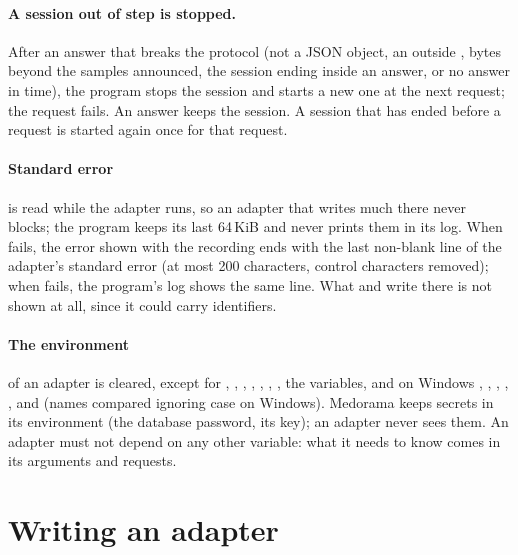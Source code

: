 \paragraph{A session out of step is stopped.} After an answer that breaks the protocol (not a
JSON object, an  outside , bytes beyond the samples announced, the
session ending inside an answer, or no answer in time), the program stops the session and starts
a new one at the next request; the request fails. An answer  keeps the
session. A session that has ended before a request is started again once for that request.

\paragraph{Standard error} is read while the adapter runs, so an adapter that writes much there
never blocks; the program keeps its last 64\,KiB and never prints them in its log. When
 fails, the error shown with the recording ends with the last non-blank line of the
adapter's standard error (at most 200 characters, control characters removed); when
 fails, the program's log shows the same line. What  and
 write there is not shown at all, since it could carry identifiers.

\paragraph{The environment} of an adapter is cleared, except for , ,
, , , , , the 
variables, and on Windows , , , ,
,  and  (names compared ignoring case on
Windows). Medorama keeps secrets in its environment (the database password, its key); an adapter
never sees them. An adapter must not depend on any other variable: what it needs to know comes
in its arguments and requests.

\section{Writing an adapter}
\label{sec:addons-writing}

